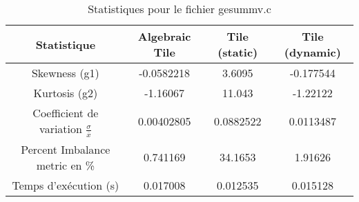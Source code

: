 \documentclass{article}
\begin{document}
\begin{table}[htbp]
  \centering
  \caption{Statistiques pour le fichier gesummv.c}
  \begin{tabular}{|c|c|c|c|}
    \hline
    Statistique & Algebraic Tile & Tile (static) & Tile (dynamic) \\ 
    \hline
    Skewness (g1) & -0.0582218 & 3.6095 & -0.177544 \\ 
    Kurtosis (g2) & -1.16067 & 11.043 & -1.22122 \\ 
    Coefficient de variation $ \frac{\sigma}{\overline{x}} $ & 0.00402805 & 0.0882522 & 0.0113487\\ 
    Percent Imbalance metric en \% & 0.741169 & 34.1653 & 1.91626\\ 
    Temps d'exécution (s) &  0.017008    &  0.012535   &  0.015128   \\ 
    \hline
  \end{tabular}
\end{table}
\newpage
\end{document}
